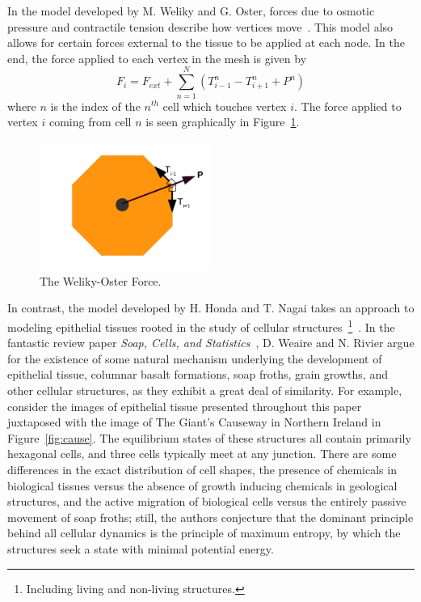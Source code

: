 In the model developed by M. Weliky and G. Oster, forces due to osmotic pressure and contractile tension describe how vertices move~\cite{WO}. This model also allows for certain forces external to the tissue to be applied at each node. In the end, the force applied to each vertex in the mesh is given by
\begin{equation*}
F_i = F_{ext}+\sum\limits_{n=1}^N(T_{i-1}^n - T_{i+1}^n + P^n)
\end{equation*}
where $n$ is the index of the $n^{th}$ cell which touches vertex $i$. The force applied to vertex $i$ coming from cell $n$  is seen graphically in Figure~\ref{fig:WO}.
\begin{figure}[h]
\centering
\includegraphics[width=0.5\textwidth]{../diagrams/welikyoster.png}
\caption{The Weliky-Oster Force.}
\label{fig:WO}
\end{figure}

In contrast, the model developed by H. Honda and T. Nagai takes an approach to modeling epithelial tissues rooted in the study of cellular structures~\footnote{Including living and non-living structures.}~\cite{VertDyn}.  In the fantastic review paper \emph{Soap, Cells, and Statistics}~\cite{Soap}, D. Weaire and N. Rivier argue for the existence of some natural mechanism underlying the development of epithelial tissue, columnar basalt formations, soap froths, grain growths, and other cellular structures, as they exhibit a great deal of similarity. For example, consider the images of epithelial tissue presented throughout this paper juxtaposed with the image of The Giant's Causeway in Northern Ireland in Figure~\ref{fig:cause}. The equilibrium states of these structures all contain primarily hexagonal cells, and three cells typically meet at any junction. There are some differences in the exact distribution of cell shapes, the presence of chemicals in biological tissues versus the absence of growth inducing chemicals in geological structures, and the active migration of biological cells versus the entirely passive movement of soap froths; still, the authors conjecture that the dominant principle behind all cellular dynamics is the principle of maximum entropy, by which the structures seek a state with minimal potential energy.

